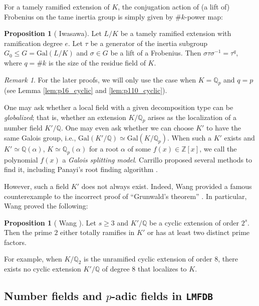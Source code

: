 \documentclass[letterpaper, 10pt]{article}
\newcommand{\Gal}{\mathrm{Gal}}
\newcommand{\bQ}{\mathbb{Q}}
\newcommand{\bZ}{\mathbb{Z}}
\newcommand{\1}{\mathds{1}}	%
\theoremstyle{definition}
\newtheorem{proposition}[theorem]{Proposition}
\theoremstyle{remark}
\newtheorem{remark}[theorem]{Remark}
\begin{document}
For a tamely ramified extension of  $K$,
the conjugation action of (a lift of) Frobenius on the tame inertia group is simply given by $\#k$-power map:
\begin{proposition}[{ Iwasawa\cite{iwasawa1955galois}}]
\label{prop:tamefrobaction}
     Let $L / K$ be a tamely ramified extension with ramification degree $e$.
    Let $\tau$ be a generator of the inertia subgroup $G_0 \le G = \Gal(L / K)$ and $\sigma \in G$ be a lift of a Frobenius.
    Then  $\sigma \tau \sigma^{-1} = \tau^q$, where $q = \# k$ is the size of the residue field of $K$.
\end{proposition}

\begin{remark}
 For the later proofs, we will only use the case when $K = \bQ_p$ and $q = p$ (see Lemma \ref{lem:p16_cyclic} and \ref{lem:p110_cyclic}).
\end{remark}

One may ask whether a local field with a given decomposition type can be \emph{globalized}; that is, whether an extension $K / \bQ_p$ arises as the localization of a number field $K' / \bQ$.
One may even ask whether we can choose $K'$ to have the same Galois group, i.e., $\Gal(K' / \bQ) \simeq \Gal(K / \bQ_p)$.
When such a $K'$ exists and $K' \simeq \bQ(\alpha)$, $K \simeq \bQ_p(\alpha)$ for a root $\alpha$ of some $f(x) \in \bZ[x]$, we call the polynomial $f(x)$ a \emph{Galois splitting model}.
Carrillo \cite{carrillo2024finding} proposed several methods to find it, including Panayi's root finding algorithm \cite[Algorithm 8.4]{pauli2001computation}.


However, such a field $K'$ does not always exist. Indeed, Wang provided a famous counterexample to the incorrect proof of ``Grunwald's theorem'' \cite{wang1948counter, wang1950grunwald}.
In particular, Wang proved the following:
\begin{proposition}[{ Wang \cite{wang1948counter}}]
\label{thm:wangcounterex}
    Let $s \ge 3$ and $K' / \bQ$ be a cyclic extension of order $2^s$.
    Then the prime $2$ either totally ramifies in $K'$ or has at least two distinct prime factors.
\end{proposition}
For example, when $K / \mathbb Q_2$ is the unramified cyclic extension of order $8$, there exists no cyclic extension $K'/\mathbb Q$ of degree $8$ that localizes to $K$.




\subsection{Number fields and $p$-adic fields in \texttt{LMFDB}}
\label{subsec:prelim_lmfdb}
\end{document}
